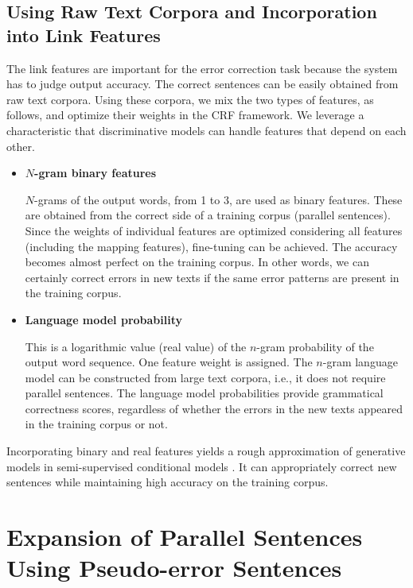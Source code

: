 \documentclass[english]{jnlp_1.4_rep}
\begin{document}
\subsection{Using Raw Text Corpora and Incorporation into Link Features}

The link features are important for the error correction task because
the system has to judge output accuracy. The correct sentences can be
easily obtained from raw text corpora. Using these corpora, we mix the
two types of features, as follows, and optimize their weights in the
CRF framework. We leverage a characteristic that discriminative models
can handle features that depend on each other.

\begin{itemize}
\item \textbf{$N$-gram binary features}

$N$-grams of the output words, from 1 to 3, are used as binary
features. These are obtained from the correct side of a training
corpus (parallel sentences). Since the weights of individual features
are optimized considering all features (including the mapping
features), fine-tuning can be achieved. The accuracy becomes almost
perfect on the training corpus. In other words, we can certainly
correct errors in new texts if the same error patterns are present in
the training corpus.

\item \textbf{Language model probability}

This is a logarithmic value (real value) of the $n$-gram probability
of the output word sequence. One feature weight is assigned. The
$n$-gram language model can be constructed from large text corpora,
i.e., it does not require parallel sentences. The language model
probabilities provide grammatical correctness scores, regardless of
whether the errors in the new texts appeared in the training corpus or
not.
\end{itemize}

Incorporating binary and real features yields a rough approximation of
generative models in semi-supervised conditional models
\cite{suzuki-EtAl:2009:EMNLP,Suzuki:SemiSupervised2010j}. It can
appropriately correct new sentences while maintaining high accuracy on
the training corpus.


\section{Expansion of Parallel Sentences Using Pseudo-error Sentences}
\label{sec-pseudo-sentences}
\end{document}
